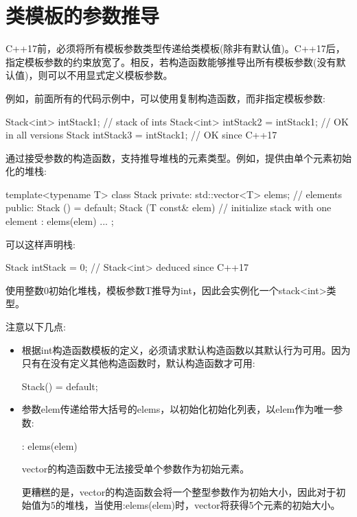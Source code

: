 \section{类模板的参数推导}

C++17前，必须将所有模板参数类型传递给类模板(除非有默认值)。C++17后，指定模板参数的约束放宽了。相反，若构造函数能够推导出所有模板参数(没有默认值)，则可以不用显式定义模板参数。

例如，前面所有的代码示例中，可以使用复制构造函数，而非指定模板参数:

\begin{cpp}
Stack<int> intStack1; // stack of ints
Stack<int> intStack2 = intStack1; // OK in all versions
Stack intStack3 = intStack1; // OK since C++17
\end{cpp}

通过接受参数的构造函数，支持推导堆栈的元素类型。例如，提供由单个元素初始化的堆栈:

\begin{cpp}
template<typename T>
class Stack {
private:
	std::vector<T> elems; // elements
public:
	Stack () = default;
	Stack (T const& elem) // initialize stack with one element
	: elems({elem}) {
	}
	...
};
\end{cpp}

可以这样声明栈:

\begin{cpp}
Stack intStack = 0; // Stack<int> deduced since C++17
\end{cpp}

使用整数0初始化堆栈，模板参数T推导为int，因此会实例化一个stack<int>类型。

注意以下几点:

\begin{itemize}
\item 
根据int构造函数模板的定义，必须请求默认构造函数以其默认行为可用。因为只有在没有定义其他构造函数时，默认构造函数才可用:
\begin{cpp}
Stack() = default;
\end{cpp}

\item 
参数elem传递给带大括号的elems，以初始化初始化列表，以elem作为唯一参数:
\begin{cpp}
: elems({elem})
\end{cpp}
vector的构造函数中无法接受单个参数作为初始元素。

\begin{notice}更糟糕的是，vector的构造函数会将一个整型参数作为初始大小，因此对于初始值为5的堆栈，当使用:elems(elem)时，vector将获得5个元素的初始大小。
\end{notice}

\end{itemize}

